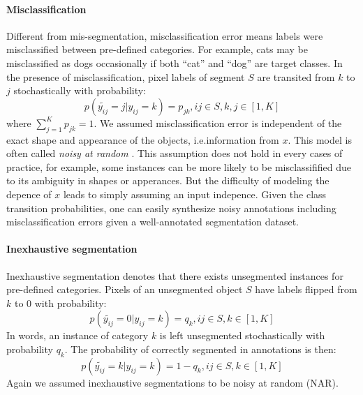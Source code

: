 \paragraph{Misclassification}
Different from mis-segmentation, misclassification error means labels were misclassified between pre-defined categories.
For example, cats may be misclassified as dogs occasionally if both ``cat'' and ``dog'' are target classes.
In the presence of misclassification, pixel labels of segment $S$ are transited from $k$ to $j$ stochastically with probability:
$$p(\tilde{y_{ij}}=j \vert y_{ij}=k) = p_{jk}, ij \in S, k,j \in [1,K]$$
where $\sum_{j=1}^{K}p_{jk}=1$.
We assumed misclassification error is independent of the exact shape and appearance of the objects, i.e.information from $x$.
This model is often called \textit{noisy at random} \cite{frenay2014classification}.
This assumption does not hold in every cases of practice, for example, some instances can be more likely to be misclassifified due to its ambiguity in shapes or apperances.
But the difficulty of modeling the depence of $x$ leads to simply assuming an input indepence.
Given the class transition probabilities, one can easily synthesize noisy annotations including misclassification errors given a well-annotated segmentation dataset.

\noindent
\paragraph{Inexhaustive segmentation}
Inexhaustive segmentation denotes that there exists unsegmented instances for pre-defined categories.
Pixels of an unsegmented object $S$ have labels flipped from $k$ to $0$ with probability:
$$p(\tilde{y_{ij}}=0\vert y_{ij}=k) = q_k, ij \in S, k \in [1,K]$$
In words, an instance of category $k$ is left unsegmented stochastically with probability $q_k$.
The probability of correctly segmented in annotations is then:
$$p(\tilde{y_{ij}}=k\vert y_{ij}=k) = 1-q_k, ij \in S, k \in [1,K]$$
Again we assumed inexhaustive segmentations to be noisy at random (NAR).





